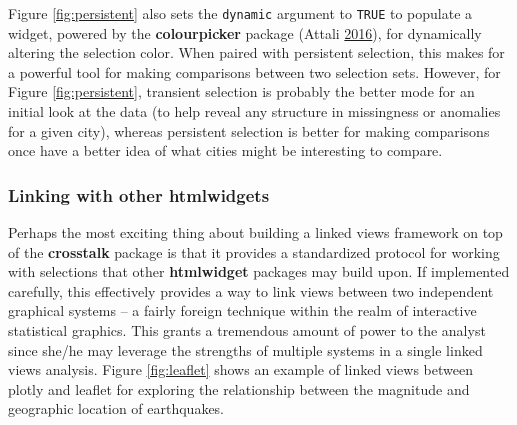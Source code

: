 \documentclass[12pt,]{isuthesis}
\newenvironment{Shaded}{\begin{snugshade}}{\end{snugshade}}
\newcommand{\KeywordTok}[1]{\textcolor[rgb]{0.13,0.29,0.53}{\textbf{{#1}}}}
\newcommand{\DataTypeTok}[1]{\textcolor[rgb]{0.13,0.29,0.53}{{#1}}}
\newcommand{\FloatTok}[1]{\textcolor[rgb]{0.00,0.00,0.81}{{#1}}}
\newcommand{\StringTok}[1]{\textcolor[rgb]{0.31,0.60,0.02}{{#1}}}
\newcommand{\OtherTok}[1]{\textcolor[rgb]{0.56,0.35,0.01}{{#1}}}
\newcommand{\NormalTok}[1]{{#1}}
\begin{document}
Figure \ref{fig:persistent} also sets the \texttt{dynamic} argument to
\texttt{TRUE} to populate a widget, powered by the \textbf{colourpicker}
package (Attali \protect\hyperlink{ref-colourpicker}{2016}), for
dynamically altering the selection color. When paired with persistent
selection, this makes for a powerful tool for making comparisons between
two selection sets. However, for Figure \ref{fig:persistent}, transient
selection is probably the better mode for an initial look at the data
(to help reveal any structure in missingness or anomalies for a given
city), whereas persistent selection is better for making comparisons
once have a better idea of what cities might be interesting to compare.

\subsubsection{Linking with other
htmlwidgets}\label{linking-with-other-htmlwidgets}

Perhaps the most exciting thing about building a linked views framework
on top of the \textbf{crosstalk} package is that it provides a
standardized protocol for working with selections that other
\textbf{htmlwidget} packages may build upon. If implemented carefully,
this effectively provides a way to link views between two independent
graphical systems -- a fairly foreign technique within the realm of
interactive statistical graphics. This grants a tremendous amount of
power to the analyst since she/he may leverage the strengths of multiple
systems in a single linked views analysis. Figure \ref{fig:leaflet}
shows an example of linked views between plotly and leaflet for
exploring the relationship between the magnitude and geographic location
of earthquakes.

\begin{Shaded}
\end{Shaded}
\end{document}
